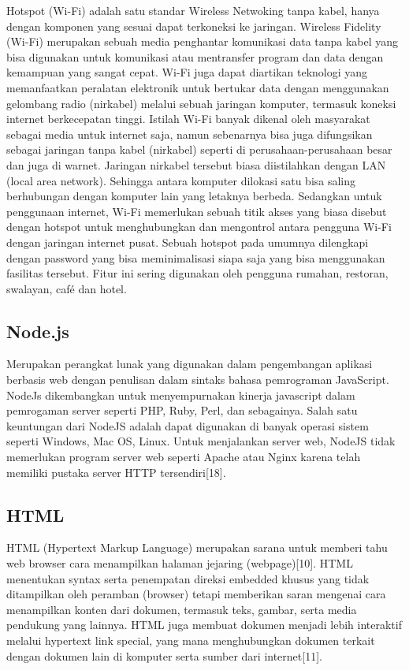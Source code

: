 Hotspot (Wi-Fi) adalah satu standar Wireless Netwoking tanpa kabel, hanya dengan komponen yang sesuai dapat terkoneksi ke jaringan\cite{trikun}. Wireless Fidelity (Wi-Fi) merupakan sebuah media penghantar komunikasi data tanpa kabel yang bisa digunakan untuk komunikasi atau mentransfer program dan data dengan kemampuan yang sangat cepat. Wi-Fi juga dapat diartikan teknologi yang memanfaatkan peralatan elektronik untuk bertukar data dengan menggunakan gelombang radio (nirkabel) melalui sebuah jaringan komputer, termasuk koneksi internet berkecepatan tinggi. Istilah Wi-Fi banyak dikenal oleh masyarakat sebagai media untuk internet saja, namun sebenarnya bisa juga difungsikan sebagai jaringan tanpa kabel (nirkabel) seperti di perusahaan-perusahaan besar dan juga di warnet. Jaringan nirkabel tersebut biasa diistilahkan dengan LAN (local area network). Sehingga antara komputer dilokasi satu bisa saling berhubungan dengan komputer lain yang letaknya berbeda. Sedangkan untuk penggunaan internet, Wi-Fi memerlukan sebuah titik akses yang biasa disebut dengan hotspot untuk menghubungkan dan mengontrol antara pengguna Wi-Fi dengan jaringan internet pusat. Sebuah hotspot pada umumnya dilengkapi dengan password yang bisa meminimalisasi siapa saja yang bisa menggunakan fasilitas tersebut. Fitur ini sering digunakan oleh pengguna rumahan, restoran, swalayan, café dan hotel.

\subsection{Node.js}
\label{sec:nodejs}

Merupakan perangkat lunak yang digunakan dalam pengembangan aplikasi berbasis web dengan penulisan dalam sintaks bahasa pemrograman JavaScript. NodeJs dikembangkan untuk menyempurnakan kinerja javascript dalam pemrogaman server seperti PHP, Ruby, Perl, dan sebagainya. Salah satu keuntungan dari NodeJS adalah dapat digunakan di banyak operasi sistem seperti Windows, Mac OS, Linux. Untuk menjalankan server web, NodeJS tidak memerlukan program server web seperti Apache atau Nginx karena telah memiliki pustaka server HTTP tersendiri[18].

\subsection{HTML}
\label{sec:html}

HTML (Hypertext Markup Language) merupakan sarana untuk memberi tahu web browser cara menampilkan halaman jejaring (webpage)[10]. HTML menentukan syntax serta penempatan direksi embedded khusus yang tidak ditampilkan oleh peramban (browser) tetapi memberikan saran mengenai cara menampilkan konten dari dokumen, termasuk teks, gambar, serta media pendukung yang lainnya. HTML juga membuat dokumen menjadi lebih interaktif melalui hypertext link special, yang mana menghubungkan dokumen terkait dengan dokumen lain di komputer serta sumber dari internet[11]. 

